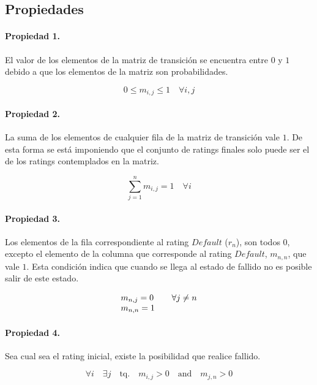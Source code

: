 \subsection{Propiedades}
\label{sec:mtransition:properties}

\paragraph{Propiedad 1.}
El valor de los elementos de la matriz de transici\'on se encuentra entre $0$ 
y $1$ debido a que los elementos de la matriz son probabilidades.

\begin{equation}
0 \leq m_{i,j} \leq 1 \quad \forall i,j
\end{equation}

\paragraph{Propiedad 2.}
La suma de los elementos de cualquier fila de la matriz de transici\'on vale $1$.
De esta forma se  est\'a imponiendo que el conjunto de ratings finales solo puede 
ser el de los ratings contemplados en la matriz.

\begin{equation}
\sum_{j=1}^{n} m_{i,j} = 1 \quad \forall i
\end{equation}

\paragraph{Propiedad 3.}
Los elementos de la fila correspondiente al rating $Default$ ($r_n$), son todos 
$0$, excepto el elemento de la columna que corresponde al rating $Default$, 
$m_{n,n}$, que vale $1$. Esta condici\'on indica que cuando se llega al estado 
de fallido no es posible salir de este estado.

\begin{equation}
\begin{array}{ll}
m_{n,j} = 0        & \quad \forall j \neq n \cr
m_{n,n} = 1
\end{array}
\end{equation}

\paragraph{Propiedad 4.}
Sea cual sea el rating inicial, existe la posibilidad que realice fallido.

\begin{equation}
\forall i \quad \exists j \quad \textrm{tq.} \quad m_{i,j} > 0 \quad \textrm{and} \quad  m_{j,n} > 0
\end{equation}


